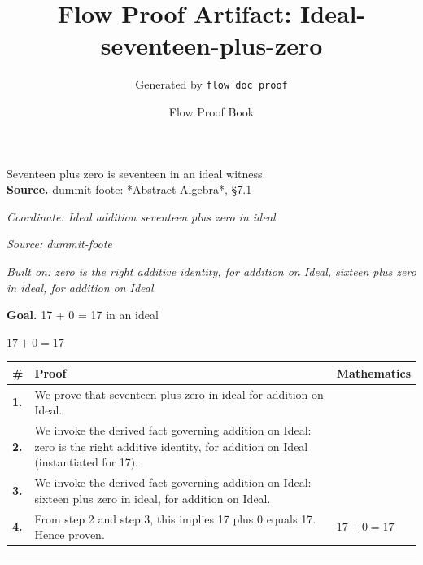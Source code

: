 \documentclass[11pt]{article}
\title{Flow Proof Artifact: Ideal-seventeen-plus-zero}
\author{Generated by \texttt{flow doc proof}}
\date{Flow Proof Book}
\theoremstyle{definition}
\begin{document}
\maketitle
Seventeen plus zero is seventeen in an ideal witness.\\[0.5em]
\textbf{Source.} dummit-foote: *Abstract Algebra*, §7.1\\[0.5em]
\bigskip
{}\par
\smallskip\noindent\textit{Coordinate: Ideal \cdot addition \cdot seventeen plus zero in ideal}\par
\smallskip\noindent\textit{Source: dummit-foote}\par
\smallskip\noindent\textit{Built on: zero is the right additive identity, for addition on Ideal, sixteen plus zero in ideal, for addition on Ideal}\par
\medskip
\noindent\textbf{Goal.} 17 + 0 = 17 in an ideal\par
\noindent$\displaystyle 17 + 0 = 17$\par
\medskip
\noindent
\begin{tabular}{@{} >{\raggedright\arraybackslash}p{} >{\raggedright\arraybackslash}p{} >{\raggedleft\arraybackslash}p{} @{}}
\textbf{\#} & \textbf{Proof} & \textbf{Mathematics} \\
\midrule
\textbf{1.} & We prove that seventeen plus zero in ideal for addition on Ideal. & \\[0.45em]
\textbf{2.} & We invoke the derived fact governing addition on Ideal: zero is the right additive identity, for addition on Ideal (instantiated for 17). & \\[0.45em]
\textbf{3.} & We invoke the derived fact governing addition on Ideal: sixteen plus zero in ideal, for addition on Ideal. & \\[0.45em]
\textbf{4.} & From step 2 and step 3, this implies 17 plus 0 equals 17. Hence proven. & $\displaystyle 17 + 0 = 17$ \\[0.45em]
\bottomrule
\end{tabular}
\label{thm:Ideal-addition-seventeen_plus_zero_in_ideal}
\par\medskip\hrule
\end{document}
